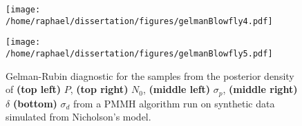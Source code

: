 \documentclass[12pt]{article}
\begin{document}
\begin{appendices}
\begin{figure}[htb]
\begin{minipage}{0.49\textwidth}
			\centering
			\texttt{[image: /home/raphael/dissertation/figures/gelmanBlowfly4.pdf]}
		\end{minipage}
		\begin{minipage}{0.49\textwidth}
			\centering
			\texttt{[image: /home/raphael/dissertation/figures/gelmanBlowfly5.pdf]}
		\end{minipage}
		\caption[Gelman-Rubin diagnostic of the chains of a PMMH algorithm run on on synthetic data, Nicholson's model]{Gelman-Rubin diagnostic for the samples from the posterior density of \textbf{(top left)} $P$, \textbf{(top right)} $N_0$,  \textbf{(middle left)} $\sigma_p$,  \textbf{(middle right)} $\delta$ \textbf{(bottom)} $\sigma_d$ from a PMMH algorithm run on synthetic data simulated from Nicholson's model.}
		\label{fig:gelmanBlowfly}
	\end{figure}
\end{appendices}
	
\end{document}

